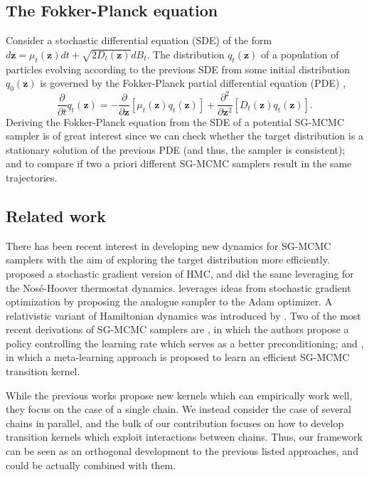 \subsection{The Fokker-Planck equation}\label{sec:fp}
Consider a stochastic differential equation (SDE) of the form $d\bm{z} = \mu_t(\bm{z})dt + \sqrt{2 D_t(\bm{z})}dB_t$. The distribution $q_t(\bm{z})$ of a population of particles evolving according to the previous SDE from some initial distribution $q_0(\bm{z})$ is governed by the Fokker-Planck partial differential equation (PDE) \cite{risken-fpe-1989},
$$
\frac{\partial}{\partial t} q_t(\bm{z}) = -\frac{\partial}{\partial \bm{z}} \left[ \mu_t(\bm{z}) q_t(\bm{z})\right] + \frac{\partial^2}{\partial \bm{z}^2} \left[ D_t(\bm{z})q_t(\bm{z})\right].
$$
Deriving the Fokker-Planck equation from the SDE of a potential SG-MCMC sampler is of great interest since we can check whether the target distribution is a stationary solution of the previous PDE (and thus, the sampler is consistent); and to compare if two a priori different SG-MCMC samplers result in the same trajectories.


\subsection{Related work}

There has been recent interest in developing new dynamics for SG-MCMC samplers with the aim of exploring the target distribution more efficiently. \cite{chen2014stochastic} proposed a stochastic gradient version of HMC, and \cite{ding2014bayesian} did the same leveraging for the Nos\'e-Hoover thermostat dynamics. \cite{chen2016bridging} leverages ideas from stochastic gradient optimization by proposing the analogue sampler to the Adam optimizer. A relativistic variant of Hamiltonian dynamics was introduced by \cite{abbati2018adageo}. Two of the most recent derivations of SG-MCMC samplers are \cite{zhang2019cyclical}, in which the authors propose a policy controlling the learning rate which serves as a better preconditioning; and \cite{gong2019meta}, in which a meta-learning approach is proposed to learn an efficient SG-MCMC transition kernel.

While the previous works propose new kernels which can empirically work well, they focus on the case of a single chain. We instead consider the case of several chains in parallel, and the bulk of our contribution focuses on how to develop transition kernels which exploit interactions between chains. Thus, our framework can be seen as an orthogonal development to the previous listed approaches, and could be actually combined with them.

